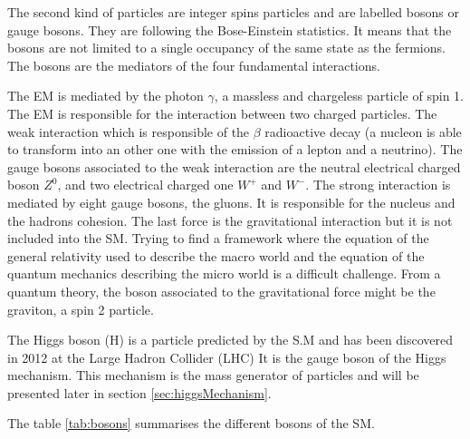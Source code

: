     The second kind of particles are integer spins particles and are labelled bosons or gauge bosons.
    They are following the Bose-Einstein statistics. 
    It means that the bosons are not limited to a single occupancy of the same state as the fermions.
    The bosons are the mediators of the four fundamental interactions.    
    
    The \acrshort{EM} is mediated by the photon $\gamma$, a massless and chargeless particle of spin 1.
    The EM is responsible for the interaction between two charged particles.
    The weak interaction which is responsible of the $\beta$ radioactive decay (a nucleon is able to transform into an other one with the emission of a lepton and a neutrino).
    The gauge bosons associated to the weak interaction are the neutral electrical charged boson $Z^0$, and two electrical charged one $W^+$ and $W^-$.
    The strong interaction is mediated by eight gauge bosons, the gluons.
    It is responsible for the nucleus and the hadrons cohesion.
    The last force is the gravitational interaction but it is not included into the \acrshort{SM}.
    Trying to find a framework where the equation of the general relativity used to describe the macro world and the equation of the quantum mechanics describing the micro world is a difficult challenge.
    From a quantum theory, the boson associated to the gravitational force might be the graviton, a spin 2 particle. 

    The Higgs boson (H) is a particle predicted by the S.M and has been discovered in 2012 at the Large Hadron Collider (LHC)
    It is the gauge boson of the Higgs mechanism.
    This mechanism is the mass generator of particles and will be presented later in section \ref{sec:higgsMechanism}.
    
    The table \ref{tab:bosons} summarises the different bosons of the \acrshort{SM}.

